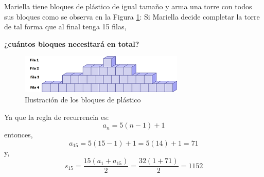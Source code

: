 Mariella tiene bloques de plástico de igual tamaño y arma una torre con todos sus bloques como se observa en la Figura \ref{fig:bloques_plastico}:
Si Mariella decide completar la torre de tal forma que al final tenga 15 filas,

\textbf{¿cuántos bloques necesitará en total?}\\

\begin{minipage}{0.35\textwidth}
    \begin{figure}[H]
        \centering
        \includegraphics[width=0.95\linewidth]{../images/57c79607ac0a75446759bf7de89522cf0cbcea57}
        \caption{Ilustración de los bloques de plástico}
        \label{fig:bloques_plastico}
    \end{figure}
\end{minipage}\hfill
\begin{minipage}{0.6\textwidth}
    \begin{solutionbox}{5cm}
        Ya que la regla de recurrencia es:
        \[a_n=5(n-1)+1\]%
        entonces,
        \[a_{15}=5(15-1)+1=5(14)+1=71\]%
        y,
        \[s_{15}=\dfrac{15(a_1+a_{15})}{2}=\dfrac{32(1+71)}{2}=1152\]
    \end{solutionbox}
\end{minipage}




